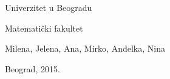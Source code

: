 \pagestyle{empty}

\begin{center}
{\sffamily

{\fontsize{16pt}{19pt}\selectfont Univerzitet u Beogradu}

{\fontsize{16pt}{19pt}\selectfont Matematički fakultet}
\vspace{150pt}

{\fontsize{16pt}{19pt}\selectfont Milena, Jelena, Ana, Mirko, Anđelka, Nina}

\vspace{50pt}
{\fontsize{22pt}{26pt}\selectfont {Zbirka programa}}

\vspace{230pt}


{\fontsize{14pt}{17pt}\selectfont Beograd, 2015.}
}
\end{center}
